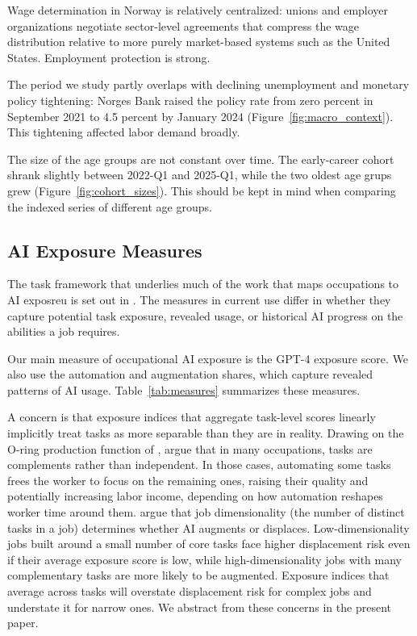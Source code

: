 \documentclass[12pt]{article}
\begin{document}
Wage determination in Norway is relatively centralized: unions and employer organizations negotiate sector-level agreements that compress the wage distribution relative to more purely market-based systems such as the United States. Employment protection is strong.

The period we study partly overlaps with declining unemployment and monetary policy tightening: Norges Bank raised the policy rate from zero percent in September 2021 to 4.5 percent by January 2024 (Figure~\ref{fig:macro_context}). This tightening affected labor demand broadly.

The size of the age groups are not constant over time. The early-career cohort shrank slightly between 2022-Q1 and 2025-Q1, while the two oldest age grups grew (Figure~\ref{fig:cohort_sizes}). This should be kept in mind when comparing the indexed series of different age groups.

\subsection{AI Exposure Measures}\label{sec:data:ai}

The task framework that underlies much of the work that maps occupations to AI exposreu is set out in \citep{autor2003skill, acemoglu2011, acemoglu2018race, acemoglu2019automation}. The measures in current use differ in whether they capture potential task exposure, revealed usage, or historical AI progress on the abilities a job requires.

Our main measure of occupational AI exposure is the \citet{eloundou2024} GPT-4 exposure score. We also use the \citet{handa2025} automation and augmentation shares, which capture revealed patterns of AI usage. Table~\ref{tab:measures} summarizes these measures.

A concern is that exposure indices that aggregate task-level scores linearly implicitly treat tasks as more separable than they are in reality. Drawing on the O-ring production function of \citep{kremer1993}, \cite{gans2025} argue that in many occupations, tasks are complements rather than independent. In those cases, automating some tasks frees the worker to focus on the remaining ones, raising their quality and potentially increasing labor income, depending on how automation reshapes worker time around them. \cite{imas2026} argue that job dimensionality (the number of distinct tasks in a job) determines whether AI augments or displaces. Low-dimensionality jobs built around a small number of core tasks face higher displacement risk even if their average exposure score is low, while high-dimensionality jobs with many complementary tasks are more likely to be augmented. Exposure indices that average across tasks will overstate displacement risk for complex jobs and understate it for narrow ones. We abstract from these concerns in the present paper. 
\end{document}
